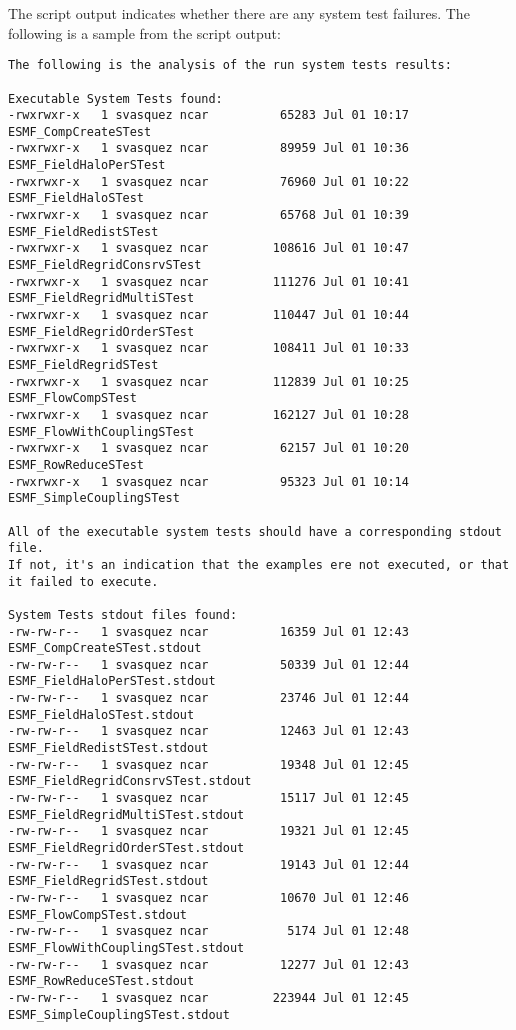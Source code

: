 The script output indicates whether there are any system test failures.
The following is a sample from the script output:

\begin{verbatim}
The following is the analysis of the run system tests results:

Executable System Tests found:
-rwxrwxr-x   1 svasquez ncar          65283 Jul 01 10:17 ESMF_CompCreateSTest
-rwxrwxr-x   1 svasquez ncar          89959 Jul 01 10:36 ESMF_FieldHaloPerSTest
-rwxrwxr-x   1 svasquez ncar          76960 Jul 01 10:22 ESMF_FieldHaloSTest
-rwxrwxr-x   1 svasquez ncar          65768 Jul 01 10:39 ESMF_FieldRedistSTest
-rwxrwxr-x   1 svasquez ncar         108616 Jul 01 10:47 ESMF_FieldRegridConsrvSTest
-rwxrwxr-x   1 svasquez ncar         111276 Jul 01 10:41 ESMF_FieldRegridMultiSTest
-rwxrwxr-x   1 svasquez ncar         110447 Jul 01 10:44 ESMF_FieldRegridOrderSTest
-rwxrwxr-x   1 svasquez ncar         108411 Jul 01 10:33 ESMF_FieldRegridSTest
-rwxrwxr-x   1 svasquez ncar         112839 Jul 01 10:25 ESMF_FlowCompSTest
-rwxrwxr-x   1 svasquez ncar         162127 Jul 01 10:28 ESMF_FlowWithCouplingSTest
-rwxrwxr-x   1 svasquez ncar          62157 Jul 01 10:20 ESMF_RowReduceSTest
-rwxrwxr-x   1 svasquez ncar          95323 Jul 01 10:14 ESMF_SimpleCouplingSTest

All of the executable system tests should have a corresponding stdout file.
If not, it's an indication that the examples ere not executed, or that it failed to execute.

System Tests stdout files found: 
-rw-rw-r--   1 svasquez ncar          16359 Jul 01 12:43 ESMF_CompCreateSTest.stdout
-rw-rw-r--   1 svasquez ncar          50339 Jul 01 12:44 ESMF_FieldHaloPerSTest.stdout
-rw-rw-r--   1 svasquez ncar          23746 Jul 01 12:44 ESMF_FieldHaloSTest.stdout
-rw-rw-r--   1 svasquez ncar          12463 Jul 01 12:43 ESMF_FieldRedistSTest.stdout
-rw-rw-r--   1 svasquez ncar          19348 Jul 01 12:45 ESMF_FieldRegridConsrvSTest.stdout
-rw-rw-r--   1 svasquez ncar          15117 Jul 01 12:45 ESMF_FieldRegridMultiSTest.stdout
-rw-rw-r--   1 svasquez ncar          19321 Jul 01 12:45 ESMF_FieldRegridOrderSTest.stdout
-rw-rw-r--   1 svasquez ncar          19143 Jul 01 12:44 ESMF_FieldRegridSTest.stdout
-rw-rw-r--   1 svasquez ncar          10670 Jul 01 12:46 ESMF_FlowCompSTest.stdout
-rw-rw-r--   1 svasquez ncar           5174 Jul 01 12:48 ESMF_FlowWithCouplingSTest.stdout
-rw-rw-r--   1 svasquez ncar          12277 Jul 01 12:43 ESMF_RowReduceSTest.stdout
-rw-rw-r--   1 svasquez ncar         223944 Jul 01 12:45 ESMF_SimpleCouplingSTest.stdout


\end{verbatim}
